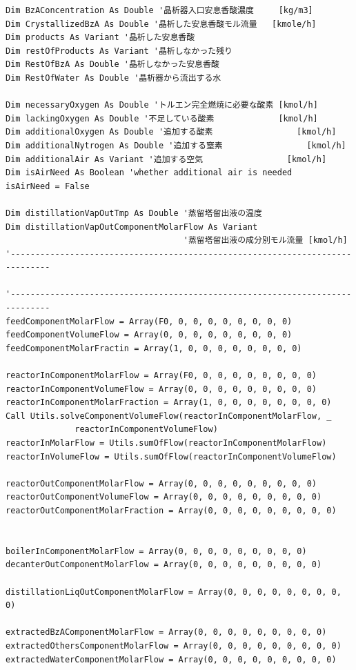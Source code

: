 \documentclass[a4j]{jsreport}
\begin{document}
\begin{lstlisting}[caption=HYSYSとpythonを繋ぐコード]
Dim BzAConcentration As Double '晶析器入口安息香酸濃度     [kg/m3]
Dim CrystallizedBzA As Double '晶析した安息香酸モル流量   [kmole/h]
Dim products As Variant '晶析した安息香酸
Dim restOfProducts As Variant '晶析しなかった残り
Dim RestOfBzA As Double '晶析しなかった安息香酸
Dim RestOfWater As Double '晶析器から流出する水

Dim necessaryOxygen As Double 'トルエン完全燃焼に必要な酸素 [kmol/h]
Dim lackingOxygen As Double '不足している酸素             [kmol/h]
Dim additionalOxygen As Double '追加する酸素                 [kmol/h]
Dim additionalNytrogen As Double '追加する窒素                 [kmol/h]
Dim additionalAir As Variant '追加する空気                 [kmol/h]
Dim isAirNeed As Boolean 'whether additional air is needed
isAirNeed = False

Dim distillationVapOutTmp As Double '蒸留塔留出液の温度
Dim distillationVapOutComponentMolarFlow As Variant
                                    '蒸留塔留出液の成分別モル流量 [kmol/h]
'------------------------------------------------------------------------------

'------------------------------------------------------------------------------
feedComponentMolarFlow = Array(F0, 0, 0, 0, 0, 0, 0, 0, 0)
feedComponentVolumeFlow = Array(0, 0, 0, 0, 0, 0, 0, 0, 0)
feedComponentMolarFractin = Array(1, 0, 0, 0, 0, 0, 0, 0, 0)

reactorInComponentMolarFlow = Array(F0, 0, 0, 0, 0, 0, 0, 0, 0)
reactorInComponentVolumeFlow = Array(0, 0, 0, 0, 0, 0, 0, 0, 0)
reactorInComponentMolarFraction = Array(1, 0, 0, 0, 0, 0, 0, 0, 0)
Call Utils.solveComponentVolumeFlow(reactorInComponentMolarFlow, _
              reactorInComponentVolumeFlow)
reactorInMolarFlow = Utils.sumOfFlow(reactorInComponentMolarFlow)
reactorInVolumeFlow = Utils.sumOfFlow(reactorInComponentVolumeFlow)

reactorOutComponentMolarFlow = Array(0, 0, 0, 0, 0, 0, 0, 0, 0)
reactorOutComponentVolumeFlow = Array(0, 0, 0, 0, 0, 0, 0, 0, 0)
reactorOutComponentMolarFraction = Array(0, 0, 0, 0, 0, 0, 0, 0, 0)


boilerInComponentMolarFlow = Array(0, 0, 0, 0, 0, 0, 0, 0, 0)
decanterOutComponentMolarFlow = Array(0, 0, 0, 0, 0, 0, 0, 0, 0)

distillationLiqOutComponentMolarFlow = Array(0, 0, 0, 0, 0, 0, 0, 0, 0)

extractedBzAComponentMolarFlow = Array(0, 0, 0, 0, 0, 0, 0, 0, 0)
extractedOthersComponentMolarFlow = Array(0, 0, 0, 0, 0, 0, 0, 0, 0)
extractedWaterComponentMolarFlow = Array(0, 0, 0, 0, 0, 0, 0, 0, 0)


\end{lstlisting}
\end{document}
